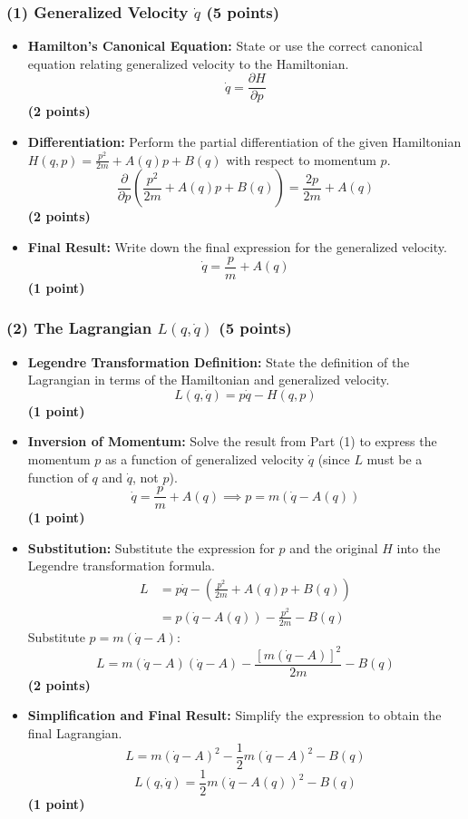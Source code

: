 \documentclass[11pt, a4paper]{article} %
\begin{document}
\subsubsection*{(1) Generalized Velocity $\dot{q}$ (5 points)}
\begin{itemize}
    \item \textbf{Hamilton's Canonical Equation:} State or use the correct canonical equation relating generalized velocity to the Hamiltonian.
    \[
    \dot{q} = \frac{\partial H}{\partial p}
    \]
    \hfill \textbf{(2 points)}
    \item \textbf{Differentiation:} Perform the partial differentiation of the given Hamiltonian $H(q,p) = \frac{p^2}{2m} + A(q)p + B(q)$ with respect to momentum $p$.
    \[
    \frac{\partial}{\partial p}\left( \frac{p^2}{2m} + A(q)p + B(q) \right) = \frac{2p}{2m} + A(q)
    \]
    \hfill \textbf{(2 points)}
    \item \textbf{Final Result:} Write down the final expression for the generalized velocity.
    \[
    \dot{q} = \frac{p}{m} + A(q)
    \]
    \hfill \textbf{(1 point)}
\end{itemize}

\subsubsection*{(2) The Lagrangian $L(q, \dot{q})$ (5 points)}
\begin{itemize}
    \item \textbf{Legendre Transformation Definition:} State the definition of the Lagrangian in terms of the Hamiltonian and generalized velocity.
    \[
    L(q, \dot{q}) = p\dot{q} - H(q, p)
    \]
    \hfill \textbf{(1 point)}
    \item \textbf{Inversion of Momentum:} Solve the result from Part (1) to express the momentum $p$ as a function of generalized velocity $\dot{q}$ (since $L$ must be a function of $q$ and $\dot{q}$, not $p$).
    \[
    \dot{q} = \frac{p}{m} + A(q) \implies p = m(\dot{q} - A(q))
    \]
    \hfill \textbf{(1 point)}
    \item \textbf{Substitution:} Substitute the expression for $p$ and the original $H$ into the Legendre transformation formula.
    \begin{align*}
        L &= p\dot{q} - \left( \frac{p^2}{2m} + A(q)p + B(q) \right) \\
          &= p(\dot{q} - A(q)) - \frac{p^2}{2m} - B(q)
    \end{align*}
    Substitute $p = m(\dot{q} - A)$:
    \[
    L = m(\dot{q} - A)(\dot{q} - A) - \frac{[m(\dot{q} - A)]^2}{2m} - B(q)
    \]
    \hfill \textbf{(2 points)} \\
    \item \textbf{Simplification and Final Result:} Simplify the expression to obtain the final Lagrangian.
    \[
    L = m(\dot{q} - A)^2 - \frac{1}{2}m(\dot{q} - A)^2 - B(q)
    \]
    \[
    L(q, \dot{q}) = \frac{1}{2}m(\dot{q} - A(q))^2 - B(q)
    \]
    \hfill \textbf{(1 point)}
\end{itemize}
\end{document}
